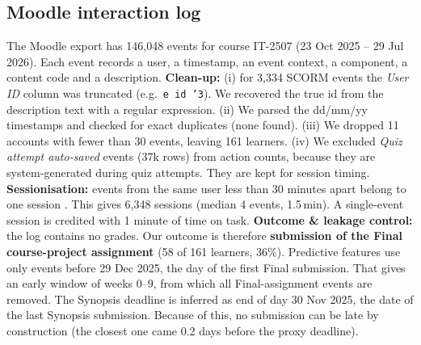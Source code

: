 \documentclass[10pt,a4paper]{article}
\begin{document}
\subsection{Moodle interaction log}
The Moodle export has 146,048 events for course IT-2507 (23 Oct 2025 -- 29 Jul 2026). Each event records a user, a
timestamp, an event context, a component, a content code and a description.
\textbf{Clean-up:} (i) for 3,334 SCORM events the \emph{User ID} column was truncated (e.g.\ \texttt{e id '3}). We
recovered the true id from the description text with a regular expression. (ii) We parsed the dd/mm/yy timestamps
and checked for exact duplicates (none found). (iii) We dropped 11 accounts with fewer than 30 events, leaving 161
learners. (iv) We excluded \emph{Quiz attempt auto-saved} events (37k rows) from action counts, because they are
system-generated during quiz attempts. They are kept for session timing.
\textbf{Sessionisation:} events from the same user less than 30 minutes apart belong to one session
\cite{kovanovic2015}. This gives 6,348 sessions (median 4 events, 1.5\,min). A single-event session is credited with
1 minute of time on task.
\textbf{Outcome \& leakage control:} the log contains no grades. Our outcome is therefore \textbf{submission of the
Final course-project assignment} (58 of 161 learners, 36\%). Predictive features use only events before 29 Dec 2025,
the day of the first Final submission. That gives an early window of weeks 0--9, from which all Final-assignment
events are removed. The Synopsis deadline is inferred as end of day 30 Nov 2025, the date of the last Synopsis
submission. Because of this, no submission can be late by construction (the closest one came 0.2 days before the
proxy deadline).

\end{document}
